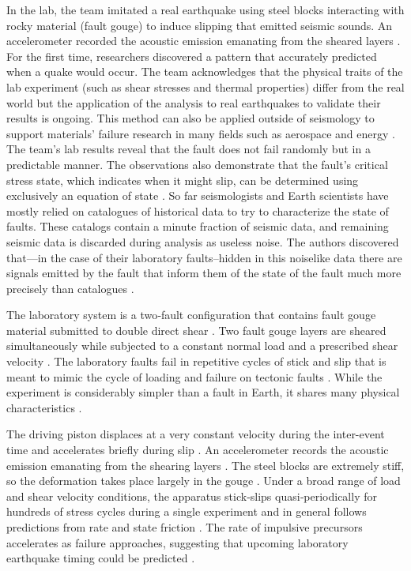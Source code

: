 \documentclass[]{llncs} %
\begin{document}
In the lab, the team imitated a real earthquake using steel blocks interacting with rocky material (fault gouge) to induce slipping that emitted seismic sounds. An accelerometer recorded the acoustic emission emanating from the sheared layers \cite{LANLNews}. For the first time, researchers discovered a pattern that accurately predicted when a quake would occur. The team acknowledges that the physical traits of the lab experiment (such as shear stresses and thermal properties) differ from the real world but the application of the analysis to real earthquakes to validate their results is ongoing. This method can also be applied outside of seismology to support materials’ failure research in many fields such as aerospace and energy \cite{LANLNews}. The team’s lab results reveal that the fault does not fail randomly but in a predictable manner. The observations also demonstrate that the fault’s critical stress state, which indicates when it might slip, can be determined using exclusively an equation of state \cite{LANLNews}. So far seismologists and Earth scientists have mostly relied on catalogues of historical data to try to characterize the state of faults. These catalogs contain a minute fraction of seismic data, and remaining seismic data is discarded during analysis as useless noise. The authors discovered that—in the case of their laboratory faults--hidden in this noiselike data there are signals emitted by the fault that inform them of the state of the fault much more precisely than catalogues \cite{LANLNews}. \par

The laboratory system is a two‐fault configuration that contains fault gouge material submitted to double direct shear \cite{kaggle}.
Two fault gouge layers are sheared simultaneously while subjected to a constant normal load and a prescribed shear velocity \cite{kaggle}. The laboratory faults fail in repetitive cycles of stick and slip that is meant to mimic the cycle of loading and failure on tectonic faults \cite{kaggle}. While the experiment is considerably simpler than a fault in Earth, it shares many physical characteristics \cite{kaggle}. \par

The driving piston displaces at a very constant velocity during the inter-event time and accelerates briefly during slip \cite{Bertrand}. An accelerometer records the acoustic emission emanating from the shearing layers \cite{Bertrand}. The steel blocks are extremely stiff, so the deformation takes place largely in the gouge \cite{Bertrand}. Under a broad range of load and shear velocity conditions, the apparatus stick‐slips quasi‐periodically for hundreds of stress cycles during a single experiment and in general follows predictions from rate and state friction \cite{Bertrand}. The rate of impulsive precursors accelerates as failure approaches, suggesting that upcoming laboratory earthquake timing could be predicted \cite{Bertrand}. \par
\end{document}
